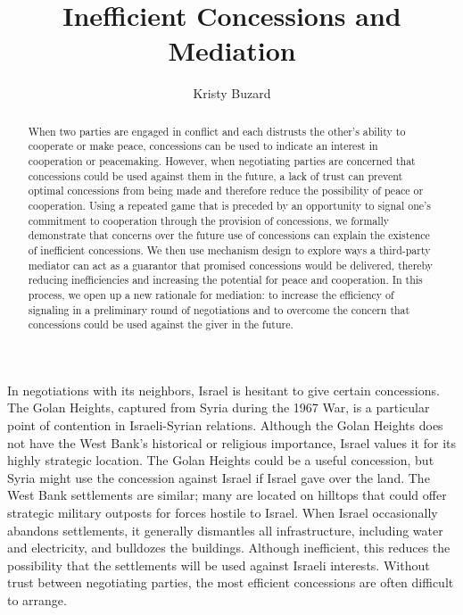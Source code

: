 \documentclass[bibtex,autowc]{apsr_submission}
\title{Inefficient Concessions and Mediation}
\author{Kristy Buzard}
       {Syracuse University}
       {We are indebted to Ben Graham for his many contributions. We thank Eli Berman, Renee Bowen, and Joel Watson as well as generous seminar participants for helpful discussions and comments. Affan Rahman and Apurvi Bhartia provided excellent research assistance. All remaining errors are our own.}
\begin{document}
\begin{frontmatter}
\begin{abstract}
When two parties are engaged in conflict and each distrusts the other's ability to cooperate or make peace, concessions can be used to indicate an interest in cooperation or peacemaking. However, when negotiating parties are concerned that concessions could be used against them in the future, a lack of trust can prevent optimal concessions from being made and therefore reduce the possibility of peace or cooperation. Using a repeated game that is preceded by an opportunity to signal one's commitment to cooperation through the provision of concessions, we formally demonstrate that concerns over the future use of concessions can explain the existence of inefficient concessions. We then use mechanism design to explore ways a third-party mediator can act as a guarantor that promised concessions would be delivered, thereby reducing inefficiencies and increasing the potential for peace and cooperation. In this process, we open up a new rationale for mediation: to increase the efficiency of signaling in a preliminary round of negotiations and to overcome the concern that concessions could be used against the giver in the future. 
\end{abstract}
\end{frontmatter}



In negotiations with its neighbors, Israel is hesitant to give certain concessions. The Golan Heights, captured from Syria during the 1967 War, is a particular point of contention in Israeli-Syrian relations. Although the Golan Heights does not have the West Bank’s historical or religious importance, Israel values it for its highly strategic location. The Golan Heights could be a useful concession, but Syria might use the concession against Israel if Israel gave over the land. The West Bank settlements are similar; many are located on hilltops that could offer strategic military outposts for forces hostile to Israel. When Israel occasionally abandons settlements, it generally dismantles all infrastructure, including water and electricity, and bulldozes the buildings. Although inefficient, this reduces the possibility that the settlements will be used against Israeli interests. Without trust between negotiating parties, the most efficient concessions are often difficult to arrange.
\end{document}
